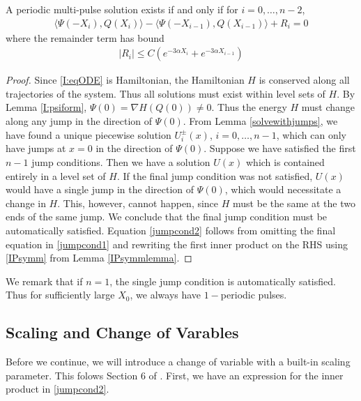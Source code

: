 \documentclass[thesis.tex]{subfiles}
\begin{document}
\begin{lemma}\label{jumplemma2}
A periodic multi-pulse solution exists if and only if for $i = 0, \dots, n-2$,
\begin{align}\label{jumpcond2}
\langle \Psi(-X_i), Q(X_i) \rangle - \langle \Psi(-X_{i-1}), Q(X_{i-1}) \rangle + R_i = 0
\end{align}
where the remainder term has bound
\begin{align*}
|R_i| \leq C ( e^{-3 \alpha X_i} +  e^{-3 \alpha X_{i-1}})
\end{align*}
\begin{proof}
Since \eqref{I:eqODE} is Hamiltonian, the Hamiltonian $H$ is conserved along all trajectories of the system. Thus all solutions must exist within level sets of $H$. By Lemma \ref{I:psiform}, $\Psi(0) = \nabla H(Q(0)) \neq 0$. Thus the energy $H$ must change along any jump in the direction of $\Psi(0)$. From Lemma \ref{solvewithjumps}, we have found a unique piecewise solution $U_i^\pm(x)$, $i = 0, \dots, n-1$, which can only have jumps at $x = 0$ in the direction of $\Psi(0)$. Suppose we have satisfied the first $n-1$ jump conditions. Then we have a solution $U(x)$ which is contained entirely in a level set of $H$. If the final jump condition was not satisfied, $U(x)$ would have a single jump in the direction of $\Psi(0)$, which would necessitate a change in $H$. This, however, cannot happen, since $H$ must be the same at the two ends of the same jump. We conclude that the final jump condition must be automatically satisfied. Equation \eqref{jumpcond2} follows from omitting the final equation in \eqref{jumpcond1} and rewriting the first inner product on the RHS using \eqref{IPsymm} from Lemma \ref{IPsymmlemma}.
\end{proof}
\end{lemma}

We remark that if $n = 1$, the single jump condition is automatically satisfied. Thus for sufficiently large $X_0$, we always have $1-$periodic pulses. 

\subsection{Scaling and Change of Varables}

Before we continue, we will introduce a change of variable with a built-in scaling parameter. This folows Section 6 of \cite{Sandstede1998}. First, we have an expression for the inner product in \ref{jumpcond2}.

\end{document}
